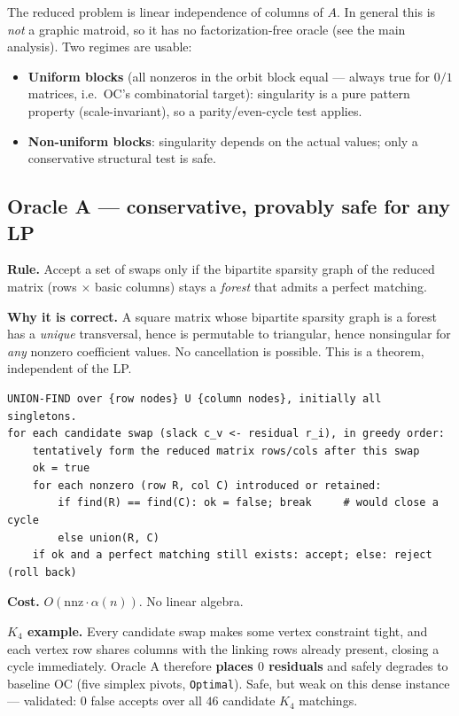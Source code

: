 \documentclass[11pt]{article}
\begin{document}
The reduced problem is linear independence of columns of $A$. In general this is
\emph{not} a graphic matroid, so it has no factorization-free oracle (see the
main analysis). Two regimes are usable:
\begin{itemize}[nosep]
  \item \textbf{Uniform blocks} (all nonzeros in the orbit block equal --- always
  true for $0/1$ matrices, i.e.\ OC's combinatorial target): singularity is a
  pure pattern property (scale-invariant), so a parity/even-cycle test applies.
  \item \textbf{Non-uniform blocks}: singularity depends on the actual values;
  only a conservative structural test is safe.
\end{itemize}

\subsection{Oracle A --- conservative, provably safe for any LP}

\textbf{Rule.} Accept a set of swaps only if the bipartite sparsity graph of the
reduced matrix (rows $\times$ basic columns) stays a \emph{forest} that admits a
perfect matching.

\textbf{Why it is correct.} A square matrix whose bipartite sparsity graph is a
forest has a \emph{unique} transversal, hence is permutable to triangular, hence
nonsingular for \emph{any} nonzero coefficient values. No cancellation is
possible. This is a theorem, independent of the LP.

\begin{verbatim}
UNION-FIND over {row nodes} U {column nodes}, initially all singletons.
for each candidate swap (slack c_v <- residual r_i), in greedy order:
    tentatively form the reduced matrix rows/cols after this swap
    ok = true
    for each nonzero (row R, col C) introduced or retained:
        if find(R) == find(C): ok = false; break     # would close a cycle
        else union(R, C)
    if ok and a perfect matching still exists: accept; else: reject (roll back)
\end{verbatim}

\textbf{Cost.} $O(\text{nnz}\cdot\alpha(n))$. No linear algebra.

\textbf{$K_4$ example.} Every candidate swap makes some vertex constraint tight,
and each vertex row shares columns with the linking rows already present, closing
a cycle immediately. Oracle A therefore \textbf{places $0$ residuals} and safely
degrades to baseline OC (five simplex pivots, \texttt{Optimal}). Safe, but weak
on this dense instance --- validated: $0$ false accepts over all $46$ candidate
$K_4$ matchings.
\end{document}
